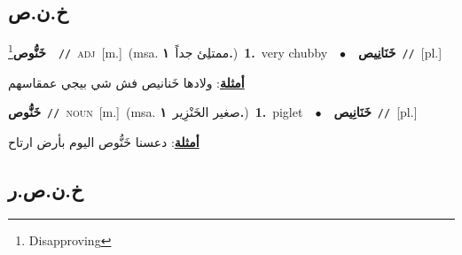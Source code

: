 \documentclass[10pt,a4paper,twoside]{article} %
\begin{document}
\begin{multicols}{2}
\vspace{-3mm}
\subsection*{\color{blue}\foreignlanguage{arabic}{خ.ن.ص}\color{blue}{}} 

{\setlength\topsep{0pt}\textbf{\foreignlanguage{arabic}{خَنُّوص}}\footnote{Disapproving}\ \ {\color{gray}\texttt{//}\color{black}}\ \textsc{adj}\ [m.]\ \color{gray}(msa. \foreignlanguage{arabic}{ممتلِئ جداً}~\foreignlanguage{arabic}{\textbf{١.}})\color{black}\ \textbf{1.}~very chubby\ \ $\bullet$\ \ \setlength\topsep{0pt}\textbf{\foreignlanguage{arabic}{خَنَانِيص}}\ {\color{gray}\texttt{//}\color{black}}\ [pl.]\  \begin{flushright}\color{gray}\foreignlanguage{arabic}{\textbf{\underline{\foreignlanguage{arabic}{أمثلة}}}: ولادها خَنانيص فش شي بيجي عمقاسهم}\end{flushright}\color{black}} \vspace{2mm}

{\setlength\topsep{0pt}\textbf{\foreignlanguage{arabic}{خَنُّوص}}\ {\color{gray}\texttt{//}\color{black}}\ \textsc{noun}\ [m.]\ \color{gray}(msa. \foreignlanguage{arabic}{صغير الخَنْزِير}~\foreignlanguage{arabic}{\textbf{١.}})\color{black}\ \textbf{1.}~piglet\ \ $\bullet$\ \ \setlength\topsep{0pt}\textbf{\foreignlanguage{arabic}{خَنَانِيص}}\ {\color{gray}\texttt{//}\color{black}}\ [pl.]\  \begin{flushright}\color{gray}\foreignlanguage{arabic}{\textbf{\underline{\foreignlanguage{arabic}{أمثلة}}}: دعسنا خَنُّوص اليوم بأرض ارتاح}\end{flushright}\color{black}} \vspace{2mm}

\vspace{-3mm}
\subsection*{\color{blue}\foreignlanguage{arabic}{خ.ن.ص.ر}\color{blue}{}} 


\end{multicols}
\end{document}
